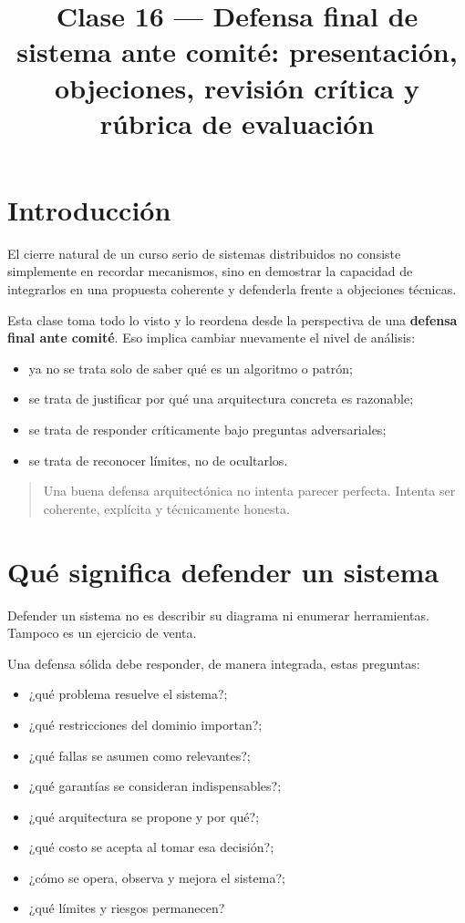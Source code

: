 \documentclass[variant=apuntes,cover=institutional,mode=screen]{ua-engineering-v6-article}
\title{Clase 16 --- Defensa final de sistema ante comité: presentación, objeciones, revisión crítica y rúbrica de evaluación}
\author{\UAProfessor}
\date{\UADate}
\begin{document}
\maketitle

\section{Introducción}

El cierre natural de un curso serio de sistemas distribuidos no consiste simplemente en recordar mecanismos, sino en demostrar la capacidad de integrarlos en una propuesta coherente y defenderla frente a objeciones técnicas.

Esta clase toma todo lo visto y lo reordena desde la perspectiva de una \textbf{defensa final ante comité}. Eso implica cambiar nuevamente el nivel de análisis:

\begin{itemize}
\item ya no se trata solo de saber qué es un algoritmo o patrón;
\item se trata de justificar por qué una arquitectura concreta es razonable;
\item se trata de responder críticamente bajo preguntas adversariales;
\item se trata de reconocer límites, no de ocultarlos.
\end{itemize}

\begin{quote}
Una buena defensa arquitectónica no intenta parecer perfecta. Intenta ser coherente, explícita y técnicamente honesta.
\end{quote}

\section{Qué significa defender un sistema}

Defender un sistema no es describir su diagrama ni enumerar herramientas. Tampoco es un ejercicio de venta.

Una defensa sólida debe responder, de manera integrada, estas preguntas:

\begin{itemize}
\item ¿qué problema resuelve el sistema?;
\item ¿qué restricciones del dominio importan?;
\item ¿qué fallas se asumen como relevantes?;
\item ¿qué garantías se consideran indispensables?;
\item ¿qué arquitectura se propone y por qué?;
\item ¿qué costo se acepta al tomar esa decisión?;
\item ¿cómo se opera, observa y mejora el sistema?;
\item ¿qué límites y riesgos permanecen?
\end{itemize}
\end{document}
